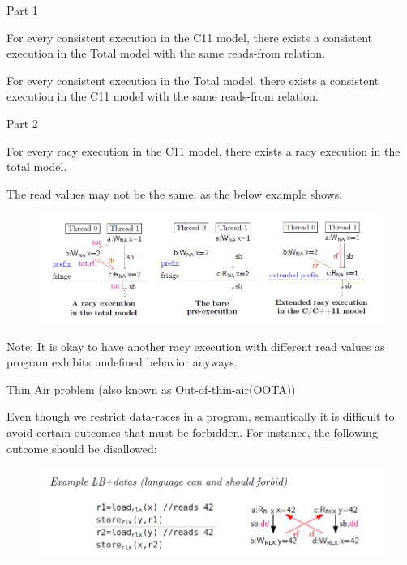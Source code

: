 \documentclass{beamer}
\begin{document}
    \begin{frame}{Part 1}

        \centering For every consistent execution in the C11 model, there exists a consistent execution in the Total model with the same reads-from relation. 

        \centering For every consistent execution in the Total model, there exists a consistent execution in the C11 model with the same reads-from relation.
    \end{frame}

    \begin{frame}{Part 2}

        \centering For every racy execution in the C11 model, there exists a racy execution in the total model.

        The read values may not be the same, as the below example shows.
        \begin{figure}
            \centering
            \includegraphics[scale=0.5]{RACY.PNG}
        \end{figure}

        Note: It is okay to have another racy execution with different read values as program exhibits undefined behavior anyways. 

    \end{frame}

    \begin{frame}{Thin Air problem (also known as Out-of-thin-air(OOTA))}
        
        Even though we restrict data-races in a program, semantically it is difficult to avoid certain outcomes that must be forbidden. 
        For instance, the following outcome should be disallowed:

        \begin{figure}
            \centering
            \includegraphics[scale=0.5]{LB+DD.PNG}
        \end{figure}
        
    \end{frame}
\end{document}
